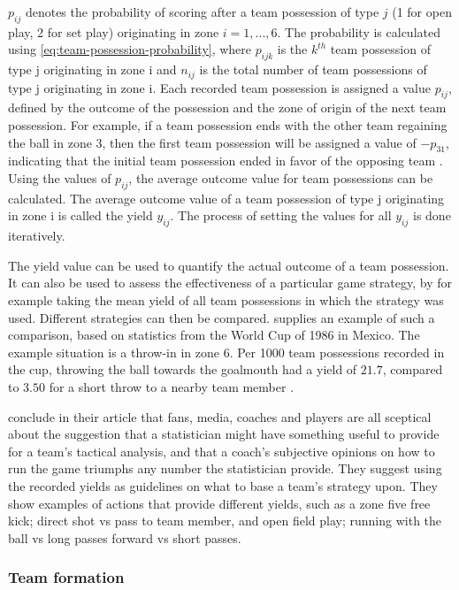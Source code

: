 $p_{ij}$ denotes the probability of scoring after a team possession of type $j$ (1 for open play, 2 for set play) originating in zone $i = 1, ..., 6$. The probability is calculated using \cref{eq:team-possession-probability}, where $p_{ijk}$ is the $k^{th}$ team possession of type j originating in zone i and $n_{ij}$ is the total number of team possessions of type j originating in zone i. Each recorded team possession is assigned a value $p_{ij}$, defined by the outcome of the possession and the zone of origin of the next team possession. For example, if a team possession ends with the other team regaining the ball in zone 3, then the first team possession will be assigned a value of $-p_{31}$, indicating that the initial team possession ended in favor of the opposing team \citep{bib:pollard-reep-1997}. Using the values of $p_{ij}$, the average outcome value for team possessions can be calculated. The average outcome value of a team possession of type j originating in zone i is called the yield $y_{ij}$. The process of setting the values for all $y_{ij}$ is done iteratively.

The yield value can be used to quantify the actual outcome of a team possession. It can also be used to assess the effectiveness of a particular game strategy, by for example taking the mean yield of all team possessions in which the strategy was used. Different strategies can then be compared. \citet{bib:pollard-reep-1997} supplies an example of such a comparison, based on statistics from the World Cup of 1986 in Mexico. The example situation is a throw-in in zone 6. Per 1000 team possessions recorded in the cup, throwing the ball towards the goalmouth had a yield of $21.7$, compared to $3.50$ for a short throw to a nearby team member \citep{bib:pollard-reep-1997}.

\citet{bib:pollard-reep-1997} conclude in their article that fans, media, coaches and players are all sceptical about the suggestion that a statistician might have something useful to provide for a team's tactical analysis, and that a coach's subjective opinions on how to run the game triumphs any number the statistician provide. They suggest using the recorded yields as guidelines on what to base a team's strategy upon. They show examples of actions that provide different yields, such as a zone five free kick; direct shot vs pass to team member, and open field play; running with the ball vs long passes forward vs short passes.

\subsubsection{Team formation}

